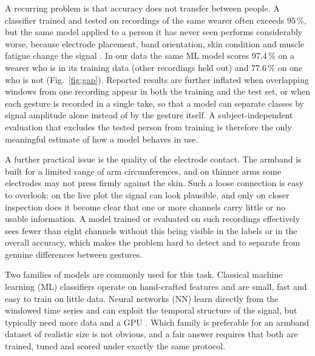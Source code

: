 \documentclass[conference]{IEEEtran}
\begin{document}
A recurring problem is that accuracy does not transfer between people. A
classifier trained and tested on recordings of the same wearer often exceeds
95\,\%, but the same model applied to a person it has never seen performs
considerably worse, because electrode placement, band orientation, skin
condition and muscle fatigue change the signal \cite{TODO_inter_subject}. In
our data the same ML model scores 97.4\,\% on a wearer who is in its training
data (other recordings held out) and 77.6\,\% on one who is not
(Fig.~\ref{fig:gap}).
Reported results are further inflated when overlapping windows from one
recording appear in both the training and the test set, or when each gesture
is recorded in a single take, so that a model can separate classes by
signal amplitude alone instead of by the gesture itself. A subject-independent
evaluation that excludes the tested person from training is therefore the only
meaningful estimate of how a model behaves in use.

A further practical issue is the quality of the electrode contact. The armband
is built for a limited range of arm circumferences, and on thinner arms some
electrodes may not press firmly against the skin. Such a loose connection is
easy to overlook: on the live plot the signal can look plausible, and only on
closer inspection does it become clear that one or more channels carry little
or no usable information. A model trained or evaluated on such recordings
effectively sees fewer than eight channels without this being visible in the
labels or in the overall accuracy, which makes the problem hard to detect
and to separate from genuine differences between gestures.

Two families of models are commonly used for this task. Classical machine
learning (ML) classifiers operate on hand-crafted features and are small,
fast and easy to train on little data. Neural networks (NN) learn directly
from the windowed time series and can exploit the temporal structure of the
signal, but typically need more data and a GPU
\cite{TODO_ml_emg,TODO_dl_emg}. Which family is preferable for an armband
dataset of realistic size is not obvious, and a fair answer requires that both
are trained, tuned and scored under exactly the same protocol.
\end{document}
